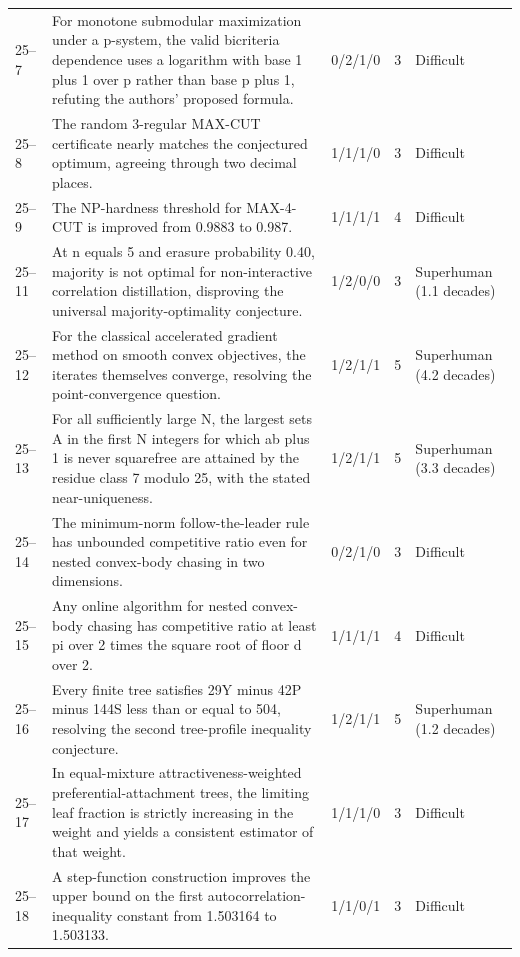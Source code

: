 \begin{landscape}
\begin{longtable}{@{}L{14mm}L{91mm}C{25mm}C{12mm}L{43mm}@{}}
25--7 & For monotone submodular maximization under a p-system, the valid bicriteria dependence uses a logarithm with base 1 plus 1 over p rather than base p plus 1, refuting the authors' proposed formula. & 0/2/1/0 & 3 & Difficult \\
25--8 & The random 3-regular MAX-CUT certificate nearly matches the conjectured optimum, agreeing through two decimal places. & 1/1/1/0 & 3 & Difficult \\
25--9 & The NP-hardness threshold for MAX-4-CUT is improved from 0.9883 to 0.987. & 1/1/1/1 & 4 & Difficult \\
25--11 & At n equals 5 and erasure probability 0.40, majority is not optimal for non-interactive correlation distillation, disproving the universal majority-optimality conjecture. & 1/2/0/0 & 3 & Superhuman (1.1 decades) \\
25--12 & For the classical accelerated gradient method on smooth convex objectives, the iterates themselves converge, resolving the point-convergence question. & 1/2/1/1 & 5 & Superhuman (4.2 decades) \\
25--13 & For all sufficiently large N, the largest sets A in the first N integers for which ab plus 1 is never squarefree are attained by the residue class 7 modulo 25, with the stated near-uniqueness. & 1/2/1/1 & 5 & Superhuman (3.3 decades) \\
25--14 & The minimum-norm follow-the-leader rule has unbounded competitive ratio even for nested convex-body chasing in two dimensions. & 0/2/1/0 & 3 & Difficult \\
25--15 & Any online algorithm for nested convex-body chasing has competitive ratio at least pi over 2 times the square root of floor d over 2. & 1/1/1/1 & 4 & Difficult \\
25--16 & Every finite tree satisfies 29Y minus 42P minus 144S less than or equal to 504, resolving the second tree-profile inequality conjecture. & 1/2/1/1 & 5 & Superhuman (1.2 decades) \\
25--17 & In equal-mixture attractiveness-weighted preferential-attachment trees, the limiting leaf fraction is strictly increasing in the weight and yields a consistent estimator of that weight. & 1/1/1/0 & 3 & Difficult \\
25--18 & A step-function construction improves the upper bound on the first autocorrelation-inequality constant from 1.503164 to 1.503133. & 1/1/0/1 & 3 & Difficult \\

\end{longtable}
\end{landscape}
